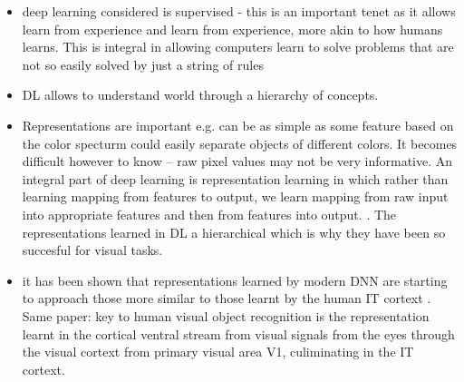 \documentclass{report}
\begin{document}
\begin{itemize}
    \item deep learning considered is supervised - this is an important tenet as it allows learn from experience and learn from experience, more akin to how humans learns. This is integral in allowing computers learn to solve problems that are not so easily solved by just a string of rules
    \item DL allows to understand world through a hierarchy of concepts. 
    \item Representations are important e.g. can be as simple as some feature based on the color specturm could easily separate objects of different colors. It becomes difficult however to know -- raw pixel values may not be very informative. An integral part of deep learning is representation learning in which rather than learning mapping from features to output, we learn mapping from raw input into appropriate features and then from features into output. \cite{Goodfellow2016}. The representations learned in DL a hierarchical which is why they have been so succesful for visual tasks.
    \item it has been shown that representations learned by modern DNN are starting to approach those more similar to those learnt by the human IT cortext \cite{Cadieu2014}. Same paper: key to human visual object recognition is the representation learnt in the cortical ventral stream from visual signals from the eyes through the visual cortext from primary visual area V1, culiminating in the IT cortext. 
\end{itemize}



\end{document}

